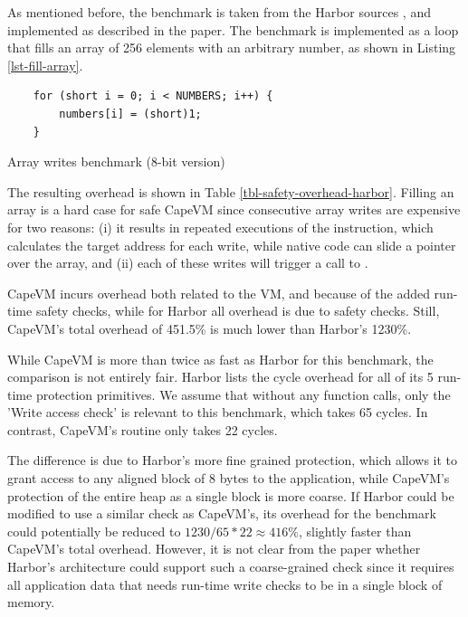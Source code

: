 As mentioned before, the  benchmark is taken from the Harbor sources \cite{sos-operating-system}, and  implemented as described in the paper. The  benchmark is implemented as a loop that fills an array of 256 elements with an arbitrary number, as shown in Listing \ref{lst-fill-array}.


\begin{listing}
\begin{verbatim}
    for (short i = 0; i < NUMBERS; i++) {
        numbers[i] = (short)1;
    }
\end{verbatim}
\caption{Array writes benchmark (8-bit version)}
\label{lst-fill-array}
\end{listing}




The resulting overhead is shown in Table \ref{tbl-safety-overhead-harbor}. Filling an array is a hard case for safe CapeVM since consecutive array writes are expensive for two reasons: (i) it results in repeated executions of the  instruction, which calculates the target address for each write, while native code can slide a pointer over the array, and (ii) each of these writes will trigger a call to .

CapeVM incurs overhead both related to the VM, and because of the added run-time safety checks, while for Harbor all overhead is due to safety checks. Still, CapeVM's total overhead of 451.5\% is much lower than Harbor's 1230\%.

While CapeVM is more than twice as fast as Harbor for this benchmark, the comparison is not entirely fair. Harbor lists the cycle overhead for all of its 5 run-time protection primitives. We assume that without any function calls, only the 'Write access check' is relevant to this benchmark, which takes 65 cycles. In contrast, CapeVM's  routine only takes 22 cycles.

The difference is due to Harbor's more fine grained protection, which allows it to grant access to any aligned block of 8 bytes to the application, while CapeVM's protection of the entire heap as a single block is more coarse. If Harbor could be modified to use a similar check as CapeVM's, its overhead for the  benchmark could potentially be reduced to $1230 / 65 * 22 \approx 416\%$, slightly faster than CapeVM's total overhead. However, it is not clear from the paper whether Harbor's architecture could support such a coarse-grained check since it requires all application data that needs run-time write checks to be in a single block of memory.

